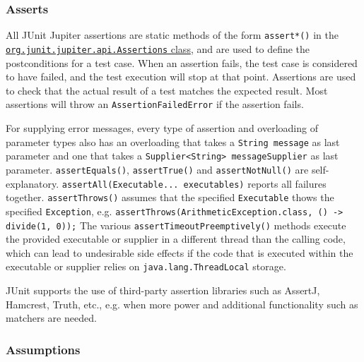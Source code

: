 \documentclass[table, xcdraw]{article}%
\begin{document}
\subsubsection{Asserts}

All JUnit Jupiter assertions are static methods of the form \texttt{assert*()} in the \href{https://junit.org/junit5/docs/5.0.1/api/org/junit/jupiter/api/Assertions.html}{\texttt{org.junit.jupiter.api.Assertions} class}, and are used to define the postconditions for a test case. When an assertion fails, the test case is considered to have failed, and the test execution will stop at that point. Assertions are used to check that the actual result of a test matches the expected result. Most assertions will throw an \texttt{AssertionFailedError} if the assertion fails.

For supplying error messages, every type of assertion and overloading of parameter types also has an overloading that takes a \texttt{String message} as last parameter and one that takes a \texttt{Supplier<String> messageSupplier} as last parameter. \texttt{assertEquals()}, \texttt{assertTrue()} and \texttt{assertNotNull()} are self-explanatory. \texttt{assertAll(Executable... executables)} reports all failures together. \texttt{assertThrows()} assumes that the specified \texttt{Executable} thows the specified \texttt{Exception}, e.g. \texttt{assertThrows(ArithmeticException.class, () -> divide(1, 0));} The various \texttt{assertTimeoutPreemptively()} methods execute the provided executable or supplier in a different thread than the calling code, which can lead to undesirable side effects if the code that is executed within the executable or supplier relies on \texttt{java.lang.ThreadLocal} storage.

JUnit supports the use of third-party assertion libraries such as AssertJ, Hamcrest, Truth, etc., e.g. when more power and additional functionality such as matchers are needed.

\subsubsection{Assumptions}
\end{document}
